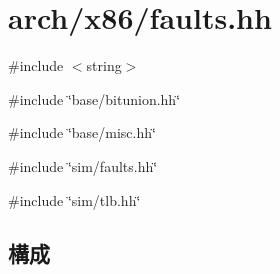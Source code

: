 \hypertarget{arch_2x86_2faults_8hh}{
\section{arch/x86/faults.hh}
\label{arch_2x86_2faults_8hh}
}
{\ttfamily \#include $<$string$>$}\par
{\ttfamily \#include \char`\"{}base/bitunion.hh\char`\"{}}\par
{\ttfamily \#include \char`\"{}base/misc.hh\char`\"{}}\par
{\ttfamily \#include \char`\"{}sim/faults.hh\char`\"{}}\par
{\ttfamily \#include \char`\"{}sim/tlb.hh\char`\"{}}\par
\subsection*{構成}
